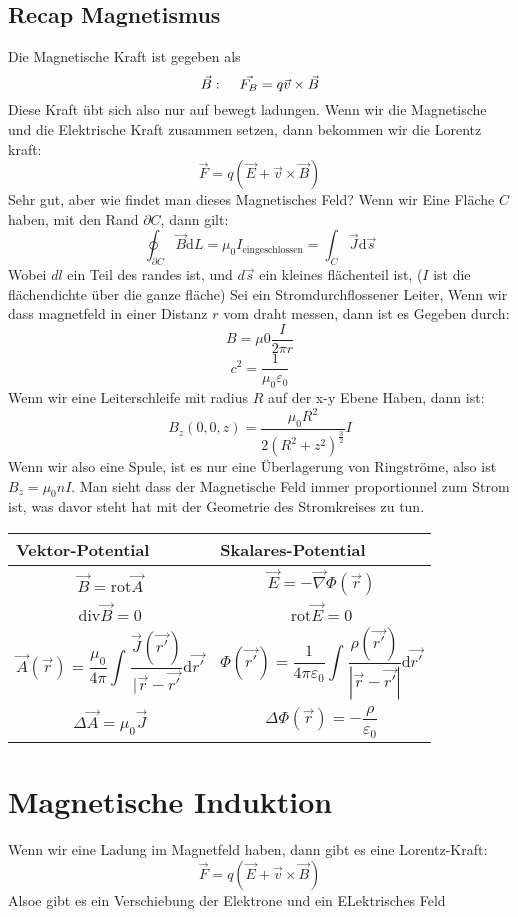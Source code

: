 \documentclass{article}
\newcommand{\mspc}{\hspace{0.4cm}}
\begin{document}
\subsection*{Recap Magnetismus}
Die Magnetische Kraft ist gegeben als \[\vec{B}:\mspc \vec{F_B}=q \vec{v}\times \vec{B}\]
Diese Kraft übt sich also nur auf bewegt ladungen. Wenn wir die Magnetische und die Elektrische Kraft zusammen setzen, dann bekommen wir die Lorentz kraft:
\[\vec{F}=q\left(\vec{E}+\vec{v}\times \vec{B}\right)\]
Sehr gut, aber wie findet man dieses Magnetisches Feld? Wenn wir Eine Fläche $C$ haben, mit den Rand $\partial C$, dann gilt:
\[\oint^{}_{\partial C}\vec{B}\text{d}L=\mu_0 I_\text{eingeschlossen}=\int^{}_{C}\vec{J}\text{d}\vec{s}\]
Wobei $dl$ ein Teil des randes ist, und $d \vec{s}$ ein kleines flächenteil ist, ($I$ ist die flächendichte über die ganze fläche)
\newline
Sei ein Stromdurchflossener Leiter, Wenn wir dass magnetfeld in einer Distanz $r$ vom draht messen, dann ist es Gegeben durch:
\[B=\mu0 \frac{I }{2\pi r}\]
\[c^2=\frac{1}{\mu_0 \varepsilon_0}\]
Wenn wir eine Leiterschleife mit radius $R$ auf der x-y Ebene Haben, dann ist:
\[B_z(0,0,z)=\frac{\mu_0 R^2}{2(R^2+z^2)^{\frac{3}{2}}}I \]
Wenn wir also eine Spule, ist es nur eine Überlagerung von Ringströme, also ist $B_z=\mu_0 n I $. 
\newline Man sieht dass der Magnetische Feld immer proportionnel zum Strom ist, was davor steht hat mit der Geometrie des Stromkreises zu tun.
\begin{center}
\begin{tabular}{|p{4cm}|p{4cm}|}
  \hline
  \textbf{Vektor-Potential}&\textbf{Skalares-Potential}\\\hline
  \[\vec{B}=\text{rot}\vec{A}\]&\[\vec{E}=-\vec{\nabla}\Phi(\vec{r})\]\\\hline
  \[\text{div}\vec{B }=0\]&\[\text{rot}\vec{E}=0\]\\\hline
  \[\vec{A}(\vec{r})=\frac{\mu_0}{4\pi}\int^{}_{}\frac{\vec{J}(\vec{r'})}{|\vec{r}-\vec{r'}}\text{d}\vec{r'}\]&\[\Phi(\vec{r'})=\frac{1}{4\pi \varepsilon_0}\int^{}_{}\frac{\rho(\vec{r'})}{|\vec{r}-\vec{r'}|}\text{d}\vec{r'}\]\\\hline
  \[\Delta \vec{A}=\mu_0 \vec{J}\]&\[\Delta \Phi(\vec{r})=-\frac{\rho}{\varepsilon_0}\]\\\hline
\end{tabular}
\end{center}

\section*{Magnetische Induktion}
Wenn wir eine Ladung im Magnetfeld haben, dann gibt es eine Lorentz-Kraft:
\[\vec{F}=q(\vec{E}+\vec{v}\times \vec{B})\]
Alsoe gibt es ein Verschiebung der Elektrone und ein ELektrisches Feld
\end{document}
